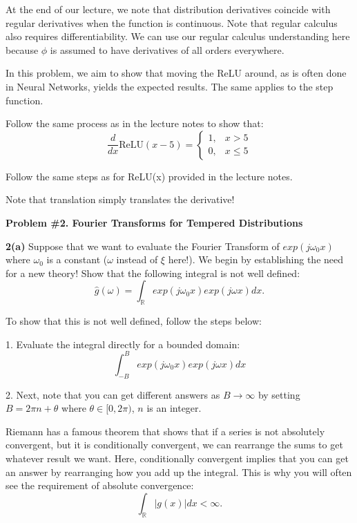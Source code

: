 \documentclass[11pt]{article}
\begin{document}
	At the end of our lecture, we note that distribution derivatives coincide with regular derivatives when the function is continuous. Note that regular calculus also requires differentiability. We can use our regular calculus understanding here because $\phi$ is assumed to have derivatives of all orders everywhere.
	
	In this problem, we aim to show that moving the ReLU around, as is often done in Neural Networks, yields the expected results. The same applies to the step function.
	
	Follow the same process as in the lecture notes to show that:
	\[
	\frac{d}{dx}\text{ReLU}(x - 5) =
	\begin{cases}
		1, & x > 5 \\
		0, & x \le 5
	\end{cases}
	\]
	
	Follow the same steps as for ReLU(x) provided in the lecture notes.
	
	Note that translation simply translates the derivative!
	
	\vspace{1em}
	
	\textbf{Problem \#2. Fourier Transforms for Tempered Distributions}
	
	\vspace{0.5em}
	
	\textbf{2(a)} Suppose that we want to evaluate the Fourier Transform of $exp(j\omega_0 x)$ where $\omega_0$ is a constant ($\omega$ instead of $\xi$ here!). We begin by establishing the need for a new theory! Show that the following integral is not well defined:
	\[
	\hat{g}(\omega) = \int_{\mathbb{R}} exp(j\omega_0 x) exp(j\omega x) dx.
	\]
	
	To show that this is not well defined, follow the steps below:
	
	1. Evaluate the integral directly for a bounded domain:
	\[
	\int_{-B}^{B} exp(j\omega_0 x) exp(j\omega x) dx
	\]
	
	2. Next, note that you can get different answers as $B \to \infty$ by setting $B = 2\pi n + \theta$ where $\theta \in [0, 2\pi)$, $n$ is an integer.
	
	Riemann has a famous theorem that shows that if a series is not absolutely convergent, but it is conditionally convergent, we can rearrange the sums to get whatever result we want. Here, conditionally convergent implies that you can get an answer by rearranging how you add up the integral. This is why you will often see the requirement of absolute convergence:
	\[
	\int_{\mathbb{R}} |g(x)| dx < \infty.
	\]
	
\end{document}
